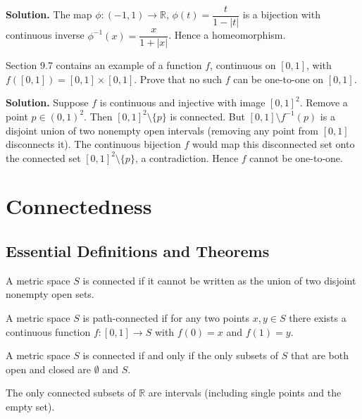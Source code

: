 \noindent\textbf{Solution.}
The map $\phi:(-1,1)\to\mathbb{R}$, $\phi(t)=\dfrac{t}{1-|t|}$ is a bijection with continuous inverse $\phi^{-1}(x)=\dfrac{x}{1+|x|}$. Hence a homeomorphism.
\medskip

\begin{problembox}
Section 9.7 contains an example of a function $f$, continuous on $[0, 1]$, with $f([0, 1]) = [0, 1] \times [0, 1]$. Prove that no such $f$ can be one-to-one on $[0, 1]$.
\end{problembox}

\noindent\textbf{Solution.}
Suppose $f$ is continuous and injective with image $[0,1]^2$. Remove a point $p\in(0,1)^2$. Then $[0,1]^2\setminus\{p\}$ is connected. But $[0,1]\setminus f^{-1}(p)$ is a disjoint union of two nonempty open intervals (removing any point from $[0,1]$ disconnects it). The continuous bijection $f$ would map this disconnected set onto the connected set $[0,1]^2\setminus\{p\}$, a contradiction. Hence $f$ cannot be one-to-one.
\medskip

\section{Connectedness}

\subsection*{Essential Definitions and Theorems}

\begin{definition}
A metric space $S$ is connected if it cannot be written as the union of two disjoint nonempty open sets.
\end{definition}

\begin{definition}
A metric space $S$ is path-connected if for any two points $x,y \in S$ there exists a continuous function $f: [0,1] \to S$ with $f(0) = x$ and $f(1) = y$.
\end{definition}

\begin{theorem}
A metric space $S$ is connected if and only if the only subsets of $S$ that are both open and closed are $\emptyset$ and $S$.
\end{theorem}

\begin{theorem}
The only connected subsets of $\mathbb{R}$ are intervals (including single points and the empty set).
\end{theorem}

